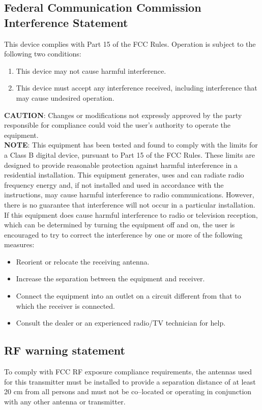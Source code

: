 \documentclass[11pt]{article}
\begin{document}
\subsection{Federal Communication Commission Interference Statement}
This device complies with Part 15 of the FCC Rules. Operation is subject to the following two conditions:
\begin{enumerate} 
	\item This device may not cause harmful interference.
	\item This device must accept any interference received, including interference that may cause undesired operation.
\end{enumerate}

{\bf CAUTION}: Changes or modifications not expressly approved by the party responsible for compliance could void the user’s authority to operate the equipment. \\

{\bf NOTE}: This equipment has been tested and found to comply with the limits for a Class B digital device, pursuant to Part 15 of the FCC Rules. These limits are designed to provide reasonable protection against harmful interference in a residential installation. This equipment generates, uses and can radiate radio frequency energy and, if not installed and used in accordance with the instructions, may cause harmful interference to radio communications. However, there is no guarantee that interference will not occur in a particular installation. If this equipment does cause harmful interference to radio or television reception, which can be determined by turning the equipment off and on, the user is encouraged to try to correct the interference by one or more of the following measures:
\begin{itemize}
	\item Reorient or relocate the receiving antenna.
	\item Increase the separation between the equipment and receiver.
	\item Connect the equipment into an outlet on a circuit different from that to which the receiver is connected.
	\item Consult the dealer or an experienced radio/TV technician for help.
\end{itemize}
\subsection{RF warning statement}
To comply with FCC RF exposure compliance requirements, the antennas used for this transmitter must be installed to provide a separation distance of at least 20 cm from all persons and must not be co–located or operating in conjunction with any other antenna or transmitter.
\end{document}
